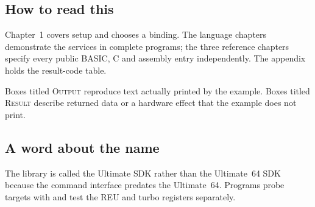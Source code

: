 \documentclass[10pt,openany]{book}
\newcommand{\evidence}[1]{}
\begin{document}
\evidence{\cmd{src/uci/sources.mk}; \cmd{bindings/cc65/Makefile};
\cmd{src/basic/Makefile}; \cmd{bindings/blob/Makefile}}

\subsection*{How to read this}

Chapter~1 covers setup and chooses a binding. The language chapters demonstrate
the services in complete programs; the three reference chapters specify every
public BASIC, C and assembly entry independently. The appendix holds the
result-code table.

Boxes titled \textsc{Output} reproduce text actually printed by the example.
Boxes titled \textsc{Result} describe returned data or a hardware effect that
the example does not print.

\subsection*{A word about the name}

The library is called the Ultimate SDK rather than the Ultimate~64 SDK because
the command interface predates the Ultimate~64. Programs probe targets with
 and test the REU and turbo registers separately.

\evidence{\cmd{docs/compatibility.md}; \cmd{include/ultimate.h}}

\mainmatter










\printindex
\end{document}
